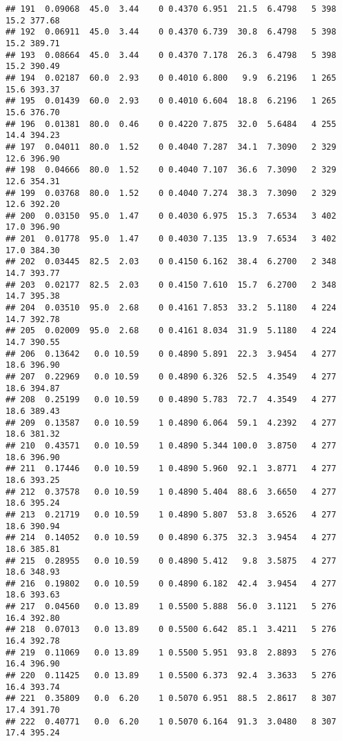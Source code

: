 \documentclass[
]{article}
\begin{document}
\begin{verbatim}
## 191  0.09068  45.0  3.44    0 0.4370 6.951  21.5  6.4798   5 398    15.2 377.68
## 192  0.06911  45.0  3.44    0 0.4370 6.739  30.8  6.4798   5 398    15.2 389.71
## 193  0.08664  45.0  3.44    0 0.4370 7.178  26.3  6.4798   5 398    15.2 390.49
## 194  0.02187  60.0  2.93    0 0.4010 6.800   9.9  6.2196   1 265    15.6 393.37
## 195  0.01439  60.0  2.93    0 0.4010 6.604  18.8  6.2196   1 265    15.6 376.70
## 196  0.01381  80.0  0.46    0 0.4220 7.875  32.0  5.6484   4 255    14.4 394.23
## 197  0.04011  80.0  1.52    0 0.4040 7.287  34.1  7.3090   2 329    12.6 396.90
## 198  0.04666  80.0  1.52    0 0.4040 7.107  36.6  7.3090   2 329    12.6 354.31
## 199  0.03768  80.0  1.52    0 0.4040 7.274  38.3  7.3090   2 329    12.6 392.20
## 200  0.03150  95.0  1.47    0 0.4030 6.975  15.3  7.6534   3 402    17.0 396.90
## 201  0.01778  95.0  1.47    0 0.4030 7.135  13.9  7.6534   3 402    17.0 384.30
## 202  0.03445  82.5  2.03    0 0.4150 6.162  38.4  6.2700   2 348    14.7 393.77
## 203  0.02177  82.5  2.03    0 0.4150 7.610  15.7  6.2700   2 348    14.7 395.38
## 204  0.03510  95.0  2.68    0 0.4161 7.853  33.2  5.1180   4 224    14.7 392.78
## 205  0.02009  95.0  2.68    0 0.4161 8.034  31.9  5.1180   4 224    14.7 390.55
## 206  0.13642   0.0 10.59    0 0.4890 5.891  22.3  3.9454   4 277    18.6 396.90
## 207  0.22969   0.0 10.59    0 0.4890 6.326  52.5  4.3549   4 277    18.6 394.87
## 208  0.25199   0.0 10.59    0 0.4890 5.783  72.7  4.3549   4 277    18.6 389.43
## 209  0.13587   0.0 10.59    1 0.4890 6.064  59.1  4.2392   4 277    18.6 381.32
## 210  0.43571   0.0 10.59    1 0.4890 5.344 100.0  3.8750   4 277    18.6 396.90
## 211  0.17446   0.0 10.59    1 0.4890 5.960  92.1  3.8771   4 277    18.6 393.25
## 212  0.37578   0.0 10.59    1 0.4890 5.404  88.6  3.6650   4 277    18.6 395.24
## 213  0.21719   0.0 10.59    1 0.4890 5.807  53.8  3.6526   4 277    18.6 390.94
## 214  0.14052   0.0 10.59    0 0.4890 6.375  32.3  3.9454   4 277    18.6 385.81
## 215  0.28955   0.0 10.59    0 0.4890 5.412   9.8  3.5875   4 277    18.6 348.93
## 216  0.19802   0.0 10.59    0 0.4890 6.182  42.4  3.9454   4 277    18.6 393.63
## 217  0.04560   0.0 13.89    1 0.5500 5.888  56.0  3.1121   5 276    16.4 392.80
## 218  0.07013   0.0 13.89    0 0.5500 6.642  85.1  3.4211   5 276    16.4 392.78
## 219  0.11069   0.0 13.89    1 0.5500 5.951  93.8  2.8893   5 276    16.4 396.90
## 220  0.11425   0.0 13.89    1 0.5500 6.373  92.4  3.3633   5 276    16.4 393.74
## 221  0.35809   0.0  6.20    1 0.5070 6.951  88.5  2.8617   8 307    17.4 391.70
## 222  0.40771   0.0  6.20    1 0.5070 6.164  91.3  3.0480   8 307    17.4 395.24

\end{verbatim}
\end{document}
